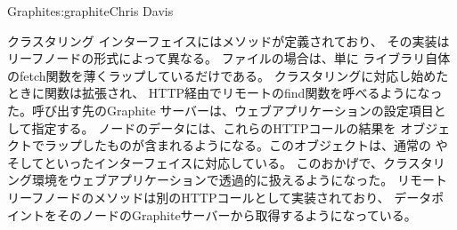 \begin{aosachapter}{Graphite}{s:graphite}{Chris Davis}
\begin{aosasect1}{クラスタリング}
インターフェイスにはメソッドが定義されており、
その実装はリーフノードの形式によって異なる。
ファイルの場合は、単に
ライブラリ自体のfetch関数を薄くラップしているだけである。
クラスタリングに対応し始めたときに関数は拡張され、
HTTP経由でリモートのfind関数を呼べるようになった。呼び出す先のGraphite
サーバーは、ウェブアプリケーションの設定項目として指定する。
ノードのデータには、これらのHTTPコールの結果を
オブジェクトでラップしたものが含まれるようになる。このオブジェクトは、通常の
やそしてといったインターフェイスに対応している。
このおかげで、クラスタリング環境をウェブアプリケーションで透過的に扱えるようになった。
リモートリーフノードのメソッドは別のHTTPコールとして実装されており、
データポイントをそのノードのGraphiteサーバーから取得するようになっている。


\end{aosasect1}
\end{aosachapter}
